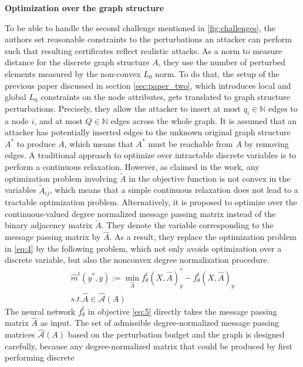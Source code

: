\documentclass[a4paper,preprint]{sig-alternate}
\begin{document}
\textbf{Optimization over the graph structure}\newline

To be able to handle the second challenge mentioned in \ref{fig:challenges}, the authors set reasonable constraints to 
the perturbations an attacker can perform such that resulting certificates reflect realistic attacks.
As a norm to measure distance for the discrete graph structure $A$, they use the number of perturbed elements
measured by the non-convex $L_0$ norm. To do that, the setup of the previous paper discussed in section \ref{sec:paper_two},
which introduces local and global $L_0$ constraints on the node attributes, gets translated to graph structure perturbations.
Precisely, they allow the attacker to insert at most $q_i \in \mathbb{N}$ edges to a node $i$, and at most $Q \in \mathbb{N}$ edges
across the whole graph. It is assumed that an attacker has potentially inserted edges to the unknown original graph 
structure $A^{\ast}$ to produce $A$, which means that $A^{\ast}$ must be reachable from $A$ by removing edges.\newline
A traditional approach to optimize over intractable discrete variables is to perform a continuous relaxation.
However, as claimed in the work, any optimization problem involving $\tilde{A}$ in the objective function is not convex 
in the variables $\tilde{A}_{ij}$, which means that a simple continuous relaxation does not lead to a tractable optimization problem.
Alternatively, it is proposed to optimize over the continuous-valued degree normalized message passing matrix instead of the binary 
adjacency matrix $\tilde{A}$. They denote the variable corresponding to the message passing matrix by $\hat{A}$. 
As a result, they replace the optimization problem in \ref{eq:4} by the following problem, which not only avoids optimization over
a discrete variable, but also the nonconvex degree normalization procedure.
\begin{gather}
\label{eq:5}
    \hat{m}^t (y^{\ast}, y) := \min_{\hat{A}} f_{\theta}^t (X, \hat{A})_y^{\ast}
    - f_{\theta}^t (X, \hat{A})_y \\
    s.t. \hat{A} \in \mathcal{\hat{A}}(A) \nonumber
\end{gather}
The neural network $f_{\theta}^t$ in objective \ref{eq:5} directly takes the message passing matrix $\hat{A}$ as input.
The set of admissible degree-normalized message passing matrices $\mathcal{\hat{A}}(A)$ based
on the perturbation budget and the graph is designed carefully, because any degree-normalized matrix that could be produced by first performing discrete
\end{document}
